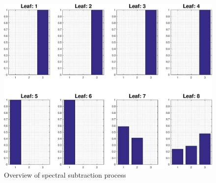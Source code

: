 \documentclass[a4paper,pra,twocolumn,10pt,aps,longbibliography,nobalancelastpage]{revtex4-1}
\begin{document}
\begin{figure}[H]
    \includegraphics[width=\columnwidth]{leaf_node_distributions}
    \caption{Overview of spectral subtraction process}
    \label{fig:spec_sub_overview}
\end{figure}
\end{document}
